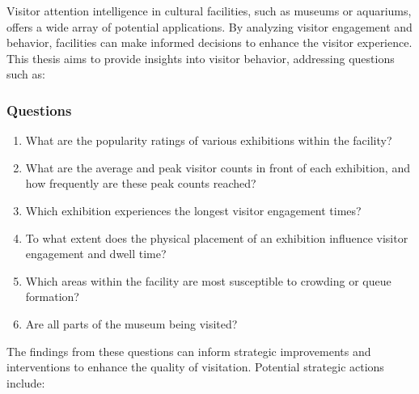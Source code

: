 Visitor attention intelligence in cultural facilities, such as museums or aquariums, offers a wide array of potential applications. By analyzing visitor engagement and behavior, facilities can make informed decisions to enhance the visitor experience. This thesis aims to provide insights into visitor behavior, addressing questions such as:

\subsubsection*{Questions} 
\begin{enumerate}
    \item What are the popularity ratings of various exhibitions within the facility?
    \item What are the average and peak visitor counts in front of each exhibition, and how frequently are these peak counts reached?
    \item Which exhibition experiences the longest visitor engagement times?
    \item To what extent does the physical placement of an exhibition influence visitor engagement and dwell time?
    \item Which areas within the facility are most susceptible to crowding or queue formation?
    \item Are all parts of the museum being visited?
\end{enumerate}

The findings from these questions can inform strategic improvements and interventions to enhance the quality of visitation. Potential strategic actions include:
